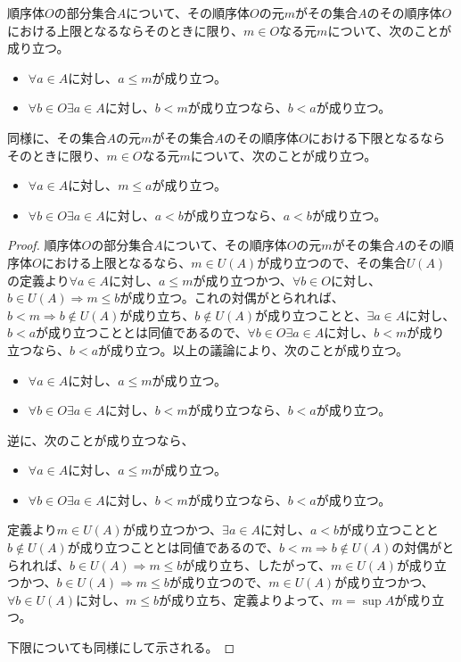 \documentclass[dvipdfmx]{jsarticle}
\begin{document}
\begin{thm}\label{4.1.1.12}
順序体$O$の部分集合$A$について、その順序体$O$の元$m$がその集合$A$のその順序体$O$における上限となるならそのときに限り、$m \in O$なる元$m$について、次のことが成り立つ。
\begin{itemize}
\item
  $\forall a \in A$に対し、$a \leq m$が成り立つ。
\item
  $\forall b \in O\exists a \in A$に対し、$b < m$が成り立つなら、$b < a$が成り立つ。
\end{itemize}\par
同様に、その集合$A$の元$m$がその集合$A$のその順序体$O$における下限となるならそのときに限り、$m \in O$なる元$m$について、次のことが成り立つ。
\begin{itemize}
\item
  $\forall a \in A$に対し、$m \leq a$が成り立つ。
\item
  $\forall b \in O\exists a \in A$に対し、$a < b$が成り立つなら、$a < b$が成り立つ。
\end{itemize}
\end{thm}
\begin{proof}
順序体$O$の部分集合$A$について、その順序体$O$の元$m$がその集合$A$のその順序体$O$における上限となるなら、$m \in U(A)$が成り立つので、その集合$U(A)$の定義より$\forall a \in A$に対し、$a \leq m$が成り立つかつ、$\forall b \in O$に対し、$b \in U(A) \Rightarrow m \leq b$が成り立つ。これの対偶がとられれば、$b < m \Rightarrow b \notin U(A)$が成り立ち、$b \notin U(A)$が成り立つことと、$\exists a \in A$に対し、$b < a$が成り立つこととは同値であるので、$\forall b \in O\exists a \in A$に対し、$b < m$が成り立つなら、$b < a$が成り立つ。以上の議論により、次のことが成り立つ。
\begin{itemize}
\item
  $\forall a \in A$に対し、$a \leq m$が成り立つ。
\item
  $\forall b \in O\exists a \in A$に対し、$b < m$が成り立つなら、$b < a$が成り立つ。
\end{itemize}\par
逆に、次のことが成り立つなら、
\begin{itemize}
\item
  $\forall a \in A$に対し、$a \leq m$が成り立つ。
\item
  $\forall b \in O\exists a \in A$に対し、$b < m$が成り立つなら、$b < a$が成り立つ。
\end{itemize}
定義より$m \in U(A)$が成り立つかつ、$\exists a \in A$に対し、$a < b$が成り立つことと$b \notin U(A)$が成り立つこととは同値であるので、$b < m \Rightarrow b \notin U(A)$の対偶がとられれば、$b \in U(A) \Rightarrow m \leq b$が成り立ち、したがって、$m \in U(A)$が成り立つかつ、$b \in U(A) \Rightarrow m \leq b$が成り立つので、$m \in U(A)$が成り立つかつ、$\forall b \in U(A)$に対し、$m \leq b$が成り立ち、定義よりよって、$m = \sup A$が成り立つ。\par
下限についても同様にして示される。
\end{proof}
\end{document}
